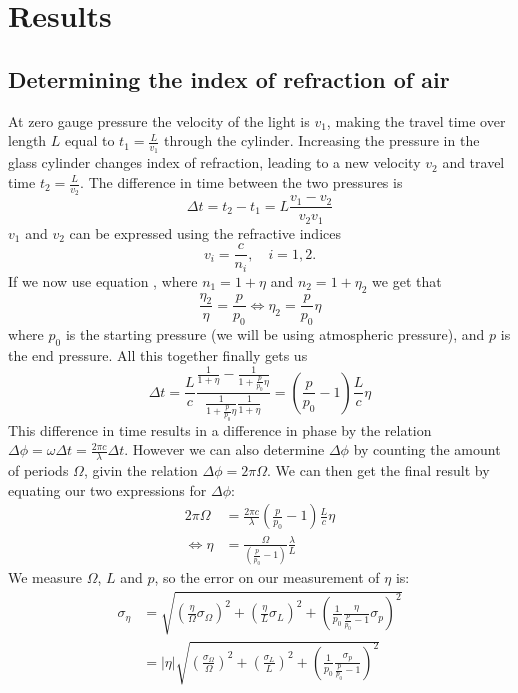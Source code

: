 \chapter{Results}
\section{Determining the index of refraction of air}
At zero gauge pressure the velocity of the light is $v_1$, 
making the travel time over length $L$  equal to $t_1=\frac{L}{v_1}$ through the cylinder.
Increasing the pressure in the glass cylinder changes index of refraction,
leading to a new velocity $v_2$ and travel time $t_2 = \frac{L}{v_2}$.
The difference in time between the two pressures is 
\[\Delta t = t_2 - t_1 = L\frac{v_1 - v_2}{v_2v_1}\]
$v_1$ and $v_2$ can be expressed using the refractive indices 
$$v_i = \frac{c}{n_i},\quad i = 1,2.$$
If we now use equation , where $n_1 = 1 + \eta$ and $n_2 = 1 + \eta_2$
we get that $$\frac{\eta_2}{\eta} = \frac{p}{p_0} \iff \eta_2 = \frac{p}{p_0}\eta$$
where $p_0$ is the starting pressure (we will be using atmospheric pressure), and $p$ is the end pressure.
All this together finally gets us
\[\Delta t = \frac{L}{c}\frac{\frac{1}{1 + \eta} - \frac{1}{1 + \frac{p}{p_0}\eta}}{\frac{1}{1 + \frac{p}{p_0}\eta}\frac{1}{1 + \eta}} = (\frac{p}{p_0}-1)\frac{L}{c}\eta\]
This difference in time results in a difference in phase by the relation $\Delta \phi = \omega \Delta t = \frac{2\pi c}{\lambda} \Delta t$.
However we can also determine $\Delta \phi$ by counting the amount of periods $\Omega$, givin the relation $\Delta \phi = 2\pi \Omega$.
We can then get the final result by equating our two expressions for $\Delta \phi$:
\begin{align}
2\pi \Omega &= \frac{2\pi c}{\lambda}(\frac{p}{p_0}-1)\frac{L}{c}\eta \nonumber \\
\iff \eta &= \frac{\Omega}{(\frac{p}{p_0} - 1)}\frac{\lambda}{L} \label{eta equation}
\end{align}
We measure $\Omega$, $L$ and $p$, so the error on our measurement of $\eta$ is:
\begin{align}
  \sigma_\eta &= \sqrt{ \left( \frac{\eta}{\Omega}\sigma_\Omega \right)^2 + \left(\frac{\eta}{L}\sigma_L \right)^2 + \left(\frac{1}{p_0}\frac{\eta}{\frac{p}{p_0} - 1}\sigma_p \right)^2} \nonumber \\
  &= |\eta| \sqrt{ \left( \frac{\sigma_\Omega}{\Omega} \right)^2 + \left( \frac{\sigma_L}{L} \right)^2 + \left(\frac{1}{p_0}\frac{\sigma_p}{\frac{p}{p_0} - 1} \right)^2} \label{eta uncertainty}
\end{align}
